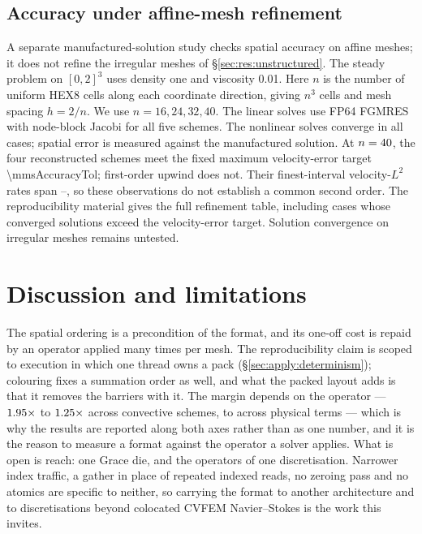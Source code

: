 \documentclass[sigconf,nonacm]{acmart}
\begin{document}
\subsection{Accuracy under affine-mesh refinement}
\label{sec:res:affine-refinement}

A separate manufactured-solution study checks spatial accuracy on affine
meshes; it does not refine the irregular meshes of \S\ref{sec:res:unstructured}.
The steady problem on $[0,2]^3$ uses density one and viscosity 0.01.
Here $n$ is the number of uniform HEX8 cells along each coordinate direction,
giving $n^3$ cells and mesh spacing $h=2/n$.
We use $n=16,24,32,40$. The linear solves use FP64 FGMRES with node-block
Jacobi for all five schemes. The nonlinear solves converge in all \mmsCases{}
cases; spatial error is measured against the manufactured solution.
At $n=40$, the four reconstructed schemes meet the fixed maximum
velocity-error target \num{\mmsAccuracyTol}; first-order upwind does not.
Their finest-interval velocity-$L^2$ rates span
\mmsReconstructedMinRate--\mmsReconstructedMaxRate, so these observations do
not establish a common second order. The reproducibility material gives the
full refinement table, including cases whose converged solutions exceed the
velocity-error target. Solution convergence on irregular meshes remains untested.

\section{Discussion and limitations}
\label{sec:discussion}

The spatial ordering is a precondition of the format, and its one-off cost is repaid by an
operator applied many times per mesh. The reproducibility claim is scoped to execution in which
one thread owns a pack (\S\ref{sec:apply:determinism}); colouring fixes a summation order as
well, and what the packed layout adds is that it removes the barriers with it. The margin
depends on the operator --- $1.95\times$ to $1.25\times$ across
convective schemes, \ladderBare{} to \ladderFull{} across physical terms --- which is why the
results are reported along both axes rather than as one number, and it is the reason to measure
a format against the operator a solver applies. What is open is reach: one Grace die, and the
operators of one discretisation. Narrower index traffic, a gather in place of repeated indexed
reads, no zeroing pass and no atomics are specific to neither, so carrying the format to another
architecture and to discretisations beyond colocated CVFEM Navier--Stokes is the work this
invites.
\end{document}
